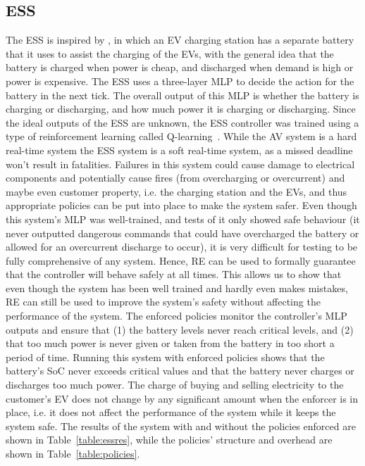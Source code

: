 \subsection{\acf{ESS}} \label{sec:ess4}
The \ac{ESS} is inspired by \cite{chaudhari2017hybrid}, in which an \ac{EV} charging station has a separate battery that it uses to assist the charging of the \acp{EV}, with the general idea that the battery is charged when power is cheap, and discharged when demand is high or power is expensive.
The \ac{ESS} uses a three-layer \ac{MLP} to decide the action for the battery in the next tick.
The overall output of this \ac{MLP} is whether the battery is charging or discharging, and how much power it is charging or discharging.
Since the ideal outputs of the \ac{ESS} are unknown, the \ac{ESS} controller was trained using a type of reinforcement learning called Q-learning~\cite{qlearning2010}.
While the \ac{AV} system is a hard real-time system the \ac{ESS} system is a soft real-time system, as a missed deadline won't result in fatalities.
Failures in this system could cause damage to electrical components and potentially cause fires (from overcharging or overcurrent) and maybe even customer property, i.e. the charging station and the \acp{EV}, and thus appropriate policies can be put into place to make the system safer.
Even though this system's \ac{MLP} was well-trained, and tests of it only showed safe behaviour (it never outputted dangerous commands that could have overcharged the battery or allowed for an overcurrent discharge to occur), it is very difficult for testing to be fully comprehensive of any system.
Hence, \ac{RE} can be used to formally guarantee that the controller will behave safely at all times.
This allows us to show that even though the system has been well trained and hardly even makes mistakes, \ac{RE} can still be used to improve the system's safety without affecting the performance of the system.
The enforced policies monitor the controller's \ac{MLP} outputs and ensure that (1) the battery levels never reach critical levels, and (2) that too much power is never given or taken from the battery in too short a period of time.
Running this system with enforced policies shows that the battery's \ac{SoC} never exceeds critical values and that the battery never charges or discharges too much power.
The charge of buying and selling electricity to the customer's \ac{EV} does not change by any significant amount when the enforcer is in place, i.e. it does not affect the performance of the system while it keeps the system safe.
The results of the system with and without the policies enforced are shown in Table~\ref{table:essres}, while the policies' structure and overhead are shown in Table~\ref{table:policies}.

